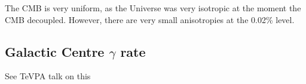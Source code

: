 The CMB is very uniform, as the Universe was very isotropic at the moment the CMB decoupled. 
However, there are very small anisotropies at the 0.02\% level.


\subsection{Galactic Centre $\gamma$ rate}
\par
See TeVPA talk on this


